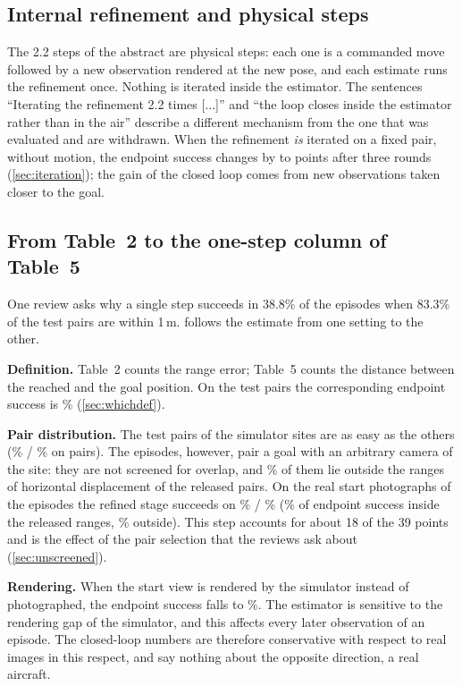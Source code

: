 \subsection{Internal refinement and physical steps}
\label{sec:internalphysical}

The 2.2 steps of the abstract are physical steps: each one is a commanded move followed by a new observation rendered at the new pose, and each estimate runs the refinement once. Nothing is iterated inside the estimator. The sentences ``Iterating the refinement 2.2 times [...]'' and ``the loop closes inside the estimator rather than in the air'' describe a different mechanism from the one that was evaluated and are withdrawn. When the refinement \emph{is} iterated on a fixed pair, without motion, the endpoint success changes by \itThreeASRe{} to \itThreeBSRe{} points after three rounds (\cref{sec:iteration}); the gain of the closed loop comes from new observations taken closer to the goal.



\subsection{From Table~2 to the one-step column of Table~5}
\label{sec:onestep}

One review asks why a single step succeeds in 38.8\% of the episodes when 83.3\% of the test pairs are within 1\,m.  follows the estimate from one setting to the other.

\noindent\textbf{Definition.} Table~2 counts the range error; Table~5 counts the distance between the reached and the goal position. On the test pairs the corresponding endpoint success is \SiiCamSRe\% (\cref{sec:whichdef}).

\noindent\textbf{Pair distribution.} The test pairs of the simulator sites are as easy as the others (\ogSiteSRd\% / \ogSiteSRe\% on \ogSiteN{} pairs). The episodes, however, pair a goal with an arbitrary camera of the site: they are not screened for overlap, and \ogOutside\% of them lie outside the ranges of horizontal displacement of the released pairs. On the real start photographs of the episodes the refined stage succeeds on \ogRealSRd\% / \ogRealSRe\% (\ogRealInSRe\% of endpoint success inside the released ranges, \ogRealOutSRe\% outside). This step accounts for about 18 of the 39 points and is the effect of the pair selection that the reviews ask about (\cref{sec:unscreened}).

\noindent\textbf{Rendering.} When the start view is rendered by the simulator instead of photographed, the endpoint success falls to \ogRendSRe\%. The estimator is sensitive to the rendering gap of the simulator, and this affects every later observation of an episode. The closed-loop numbers are therefore conservative with respect to real images in this respect, and say nothing about the opposite direction, a real aircraft.

